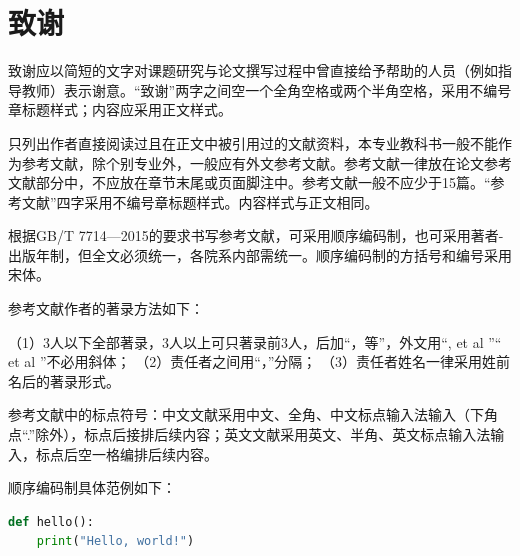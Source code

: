 \chapter{\texorpdfstring{致\quad 谢}{致谢}} %

致谢应以简短的文字对课题研究与论文撰写过程中曾直接给予帮助的人员（例如指导教师）表示谢意。“致谢”两字之间空一个全角空格或两个半角空格，采用不编号章标题样式；内容应采用正文样式。

\vspace{1cm}
{}

只列出作者直接阅读过且在正文中被引用过的文献资料，本专业教科书一般不能作为参考文献，除个别专业外，一般应有外文参考文献。参考文献一律放在论文参考文献部分中，不应放在章节末尾或页面脚注中。参考文献一般不应少于15篇。“参考文献”四字采用不编号章标题样式。内容样式与正文相同。

根据GB/T 7714—2015的要求书写参考文献，可采用顺序编码制，也可采用著者-出版年制，但全文必须统一，各院系内部需统一。顺序编码制的方括号和编号采用宋体。

参考文献作者的著录方法如下：

（1）3人以下全部著录，3人以上可只著录前3人，后加“，等”，外文用“, et al ”“ et al ”不必用斜体；
（2）责任者之间用“，”分隔；
（3）责任者姓名一律采用姓前名后的著录形式。

参考文献中的标点符号：中文文献采用中文、全角、中文标点输入法输入（下角点“.”除外），标点后接排后续内容；英文文献采用英文、半角、英文标点输入法输入，标点后空一格编排后续内容。

顺序编码制具体范例如下：{}

\vspace{1cm}
{}

\begin{lstlisting}[language=Python,caption={Python示例代码},label={lst:test}]
def hello():
    print("Hello, world!")
\end{lstlisting}

\clearpage